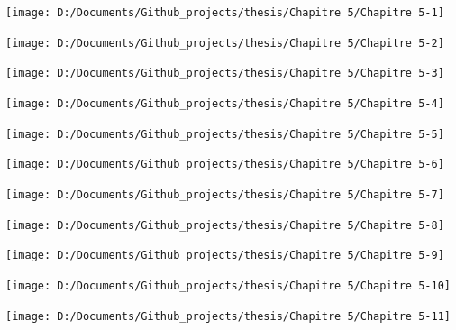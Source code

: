 \documentclass[
  english,
  man]{apa6}
\begin{document}
\begin{center}\texttt{[image: D:/Documents/Github\_projects/thesis/Chapitre 5/Chapitre 5-1]} \end{center}

\begin{center}\texttt{[image: D:/Documents/Github\_projects/thesis/Chapitre 5/Chapitre 5-2]} \end{center}

\begin{center}\texttt{[image: D:/Documents/Github\_projects/thesis/Chapitre 5/Chapitre 5-3]} \end{center}

\begin{center}\texttt{[image: D:/Documents/Github\_projects/thesis/Chapitre 5/Chapitre 5-4]} \end{center}

\begin{center}\texttt{[image: D:/Documents/Github\_projects/thesis/Chapitre 5/Chapitre 5-5]} \end{center}

\begin{center}\texttt{[image: D:/Documents/Github\_projects/thesis/Chapitre 5/Chapitre 5-6]} \end{center}

\begin{center}\texttt{[image: D:/Documents/Github\_projects/thesis/Chapitre 5/Chapitre 5-7]} \end{center}

\begin{center}\texttt{[image: D:/Documents/Github\_projects/thesis/Chapitre 5/Chapitre 5-8]} \end{center}

\begin{center}\texttt{[image: D:/Documents/Github\_projects/thesis/Chapitre 5/Chapitre 5-9]} \end{center}

\begin{center}\texttt{[image: D:/Documents/Github\_projects/thesis/Chapitre 5/Chapitre 5-10]} \end{center}

\begin{center}\texttt{[image: D:/Documents/Github\_projects/thesis/Chapitre 5/Chapitre 5-11]} \end{center}
\end{document}
